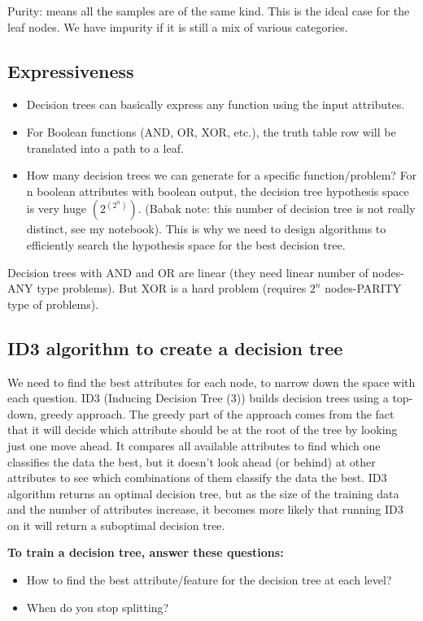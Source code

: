 \documentclass[12pt]{report}
\begin{document}
Purity: means all the samples are of the same kind. This is the ideal case for the leaf nodes. We have impurity if it is still a mix of various categories.

\subsection{Expressiveness}

\begin{itemize}
	\item Decision trees can basically express any function using the input attributes.
	\item For Boolean functions (AND, OR, XOR, etc.), the truth table row will be translated into a path to a leaf.
	\item How many decision trees we can generate for a specific function/problem? For n boolean attributes with boolean output, the decision tree hypothesis space is very huge $(2^{(2^{n})})$. (Babak note:  this number of decision tree is not really distinct, see my notebook).
	This is why we need to design algorithms to efficiently search the hypothesis space for the best decision tree.
\end{itemize}

Decision trees with AND and OR are linear (they need linear number of nodes-ANY type problems). But XOR is a hard problem (requires $2^n$ nodes-PARITY type of problems).

\subsection{ID3 algorithm to create a decision tree}
We need to find the best attributes for each node, to narrow down the space with each question.
ID3 (Inducing Decision Tree (3)) builds decision trees using a top-down, greedy approach. The greedy part of the approach comes from the fact that it will decide which attribute should be at the root of the tree by looking just one move ahead. It compares all available attributes to find which one classifies the data the best, but it doesn't look ahead (or behind) at other attributes to see which combinations of them classify the data the best. ID3 algorithm returns an optimal decision tree, but as the size of the training data and the number of attributes increase, it becomes more likely that running ID3 on it will return a suboptimal decision tree.

\hfill \break
\textbf{To train a decision tree, answer these questions:}
\begin{itemize}
	\item How to find the best attribute/feature for the decision tree at each level?
	\item When do you stop splitting?
\end{itemize}
\end{document}
